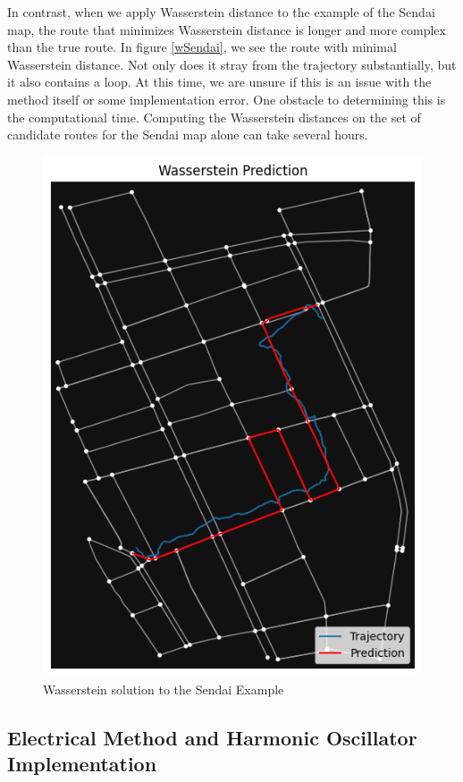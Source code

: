\documentclass{article}
\numberwithin{equation}{section}
\theoremstyle{definition}
\begin{document}
In contrast, when we apply Wasserstein distance to the example of the Sendai map, the route that minimizes Wasserstein distance is longer and more complex than the true route. In figure \autoref{wSendai}, we see the route with minimal Wasserstein distance. Not only does it stray from the trajectory substantially, but it also contains a loop. At this time, we are unsure if this is an issue with the method itself or some implementation error. One obstacle to determining this is the computational time. Computing the Wasserstein distances on the set of candidate routes for the Sendai map alone can take several hours.

\begin{figure}[h!]
    \centering
    \includegraphics[scale =.3]{Jupyter Notebook LaTeX/wassersteinsendai.png}
    \caption{Wasserstein solution to the Sendai Example}
    \label{wSendai}
\end{figure}




\subsection{Electrical Method and Harmonic Oscillator Implementation}
\end{document}
